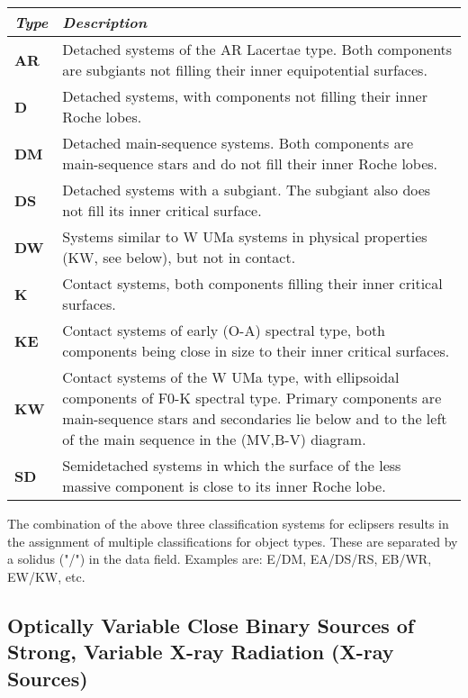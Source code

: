 \begin{longtabu} to \textwidth {l|X}
\toprule
\emph{Type} & \emph{Description}\tabularnewline
\midrule
\textbf{AR} & Detached systems of the AR Lacertae type. Both components
are subgiants not filling their inner equipotential
surfaces.\tabularnewline
\textbf{D} & Detached systems, with components not filling their inner
Roche lobes.\tabularnewline
\textbf{DM} & Detached main-sequence systems. Both components are
main-sequence stars and do not fill their inner Roche
lobes.\tabularnewline
\textbf{DS} & Detached systems with a subgiant. The subgiant also does
not fill its inner critical surface.\tabularnewline
\textbf{DW} & Systems similar to W UMa systems in physical properties
(KW, see below), but not in contact.\tabularnewline
\textbf{K} & Contact systems, both components filling their inner
critical surfaces.\tabularnewline
\textbf{KE} & Contact systems of early (O-A) spectral type, both
components being close in size to their inner critical
surfaces.\tabularnewline
\textbf{KW} & Contact systems of the W UMa type, with ellipsoidal
components of F0-K spectral type. Primary components are main-sequence
stars and secondaries lie below and to the left of the main sequence in
the (MV,B-V) diagram.\tabularnewline
\textbf{SD} & Semidetached systems in which the surface of the less
massive component is close to its inner Roche lobe.\tabularnewline
\bottomrule
\end{longtabu}

The combination of the above three classification systems for eclipsers
results in the assignment of multiple classifications for object types.
These are separated by a solidus ("/") in the data field. Examples are:
E/DM, EA/DS/RS, EB/WR, EW/KW, etc.

\subsection{Optically Variable Close Binary Sources of Strong, Variable
X-ray Radiation (X-ray
Sources)}\label{optically-variable-close-binary-sources-of-strong-variable-x-ray-radiation-x-ray-sources}

